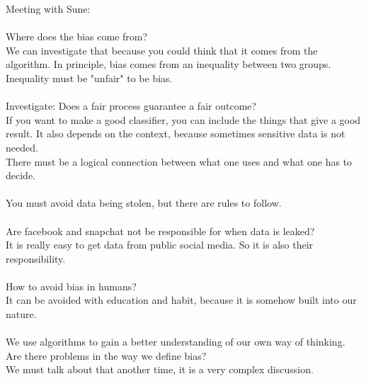 \documentclass[11pt, fleqn]{article}
\begin{document}
\noindent Meeting with Sune:\\\\

\noindent Where does the bias come from?\\
\noindent We can investigate that because you could think that it comes from the algorithm. In principle, bias comes from an inequality between two groups. Inequality must be "unfair" to be bias.\\\\

\noindent Investigate: Does a fair process guarantee a fair outcome?\\
\noindent If you want to make a good classifier, you can include the things that give a good result. It also depends on the context, because sometimes sensitive data is not needed.\\
\noindent There must be a logical connection between what one uses and what one has to decide.\\\\

\noindent You must avoid data being stolen, but there are rules to follow.\\\\

\noindent Are facebook and snapchat not be responsible for when data is leaked?\\
\noindent It is really easy to get data from public social media. So it is also their responsibility.\\\\

\noindent How to avoid bias in humans?\\
\noindent It can be avoided with education and habit, because it is somehow built into our nature.\\\\

\noindent We use algorithms to gain a better understanding of our own way of thinking.\\

\noindent Are there problems in the way we define bias?\\
\noindent We must talk about that another time, it is a very complex discussion.
\end{document}
